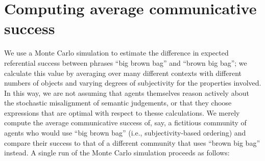 \documentclass[10pt,a4paper]{article}
\begin{document}
\section{Computing average communicative success}

We use a Monte Carlo simulation to estimate the difference in expected referential success between phrases ``big brown bag'' and ``brown big bag''; we calculate this value by averaging over many different contexts with different numbers of objects and varying degrees of subjectivity for the properties involved. In this way, we are not assuming that agents themselves reason actively about the stochastic misalignment of semantic judgements, or that they choose expressions that are optimal with respect to thesse calculations. We merely compute the average communicative success of, say, a fictitious community of agents who would use ``big brown bag'' (i.e., subjectivity-based ordering) and compare their success to that of a different community that uses ``brown big bag'' instead. A single run of the Monte Carlo simulation proceeds as follows:
\end{document}
